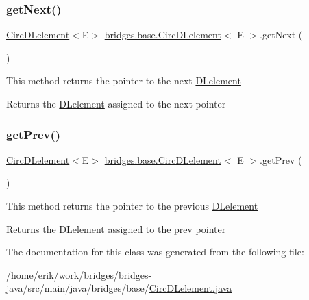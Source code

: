 \subsubsection{\texorpdfstring{get\+Next()}{getNext()}}
{\footnotesize\ttfamily \hyperlink{classbridges_1_1base_1_1_circ_d_lelement}{Circ\+D\+Lelement}$<$E$>$ \hyperlink{classbridges_1_1base_1_1_circ_d_lelement}{bridges.\+base.\+Circ\+D\+Lelement}$<$ E $>$.get\+Next (\begin{DoxyParamCaption}{ }\end{DoxyParamCaption})}

This method returns the pointer to the next \hyperlink{classbridges_1_1base_1_1_d_lelement}{D\+Lelement}

\begin{DoxyReturn}{Returns}
the \hyperlink{classbridges_1_1base_1_1_d_lelement}{D\+Lelement} assigned to the next pointer 
\end{DoxyReturn}
\mbox{\label{classbridges_1_1base_1_1_circ_d_lelement_aa2b83017a571694460f77dd31b4188ed}} 
\subsubsection{\texorpdfstring{get\+Prev()}{getPrev()}}
{\footnotesize\ttfamily \hyperlink{classbridges_1_1base_1_1_circ_d_lelement}{Circ\+D\+Lelement}$<$E$>$ \hyperlink{classbridges_1_1base_1_1_circ_d_lelement}{bridges.\+base.\+Circ\+D\+Lelement}$<$ E $>$.get\+Prev (\begin{DoxyParamCaption}{ }\end{DoxyParamCaption})}

This method returns the pointer to the previous \hyperlink{classbridges_1_1base_1_1_d_lelement}{D\+Lelement}

\begin{DoxyReturn}{Returns}
the \hyperlink{classbridges_1_1base_1_1_d_lelement}{D\+Lelement} assigned to the prev pointer 
\end{DoxyReturn}


The documentation for this class was generated from the following file\+:\begin{DoxyCompactItemize}
\item 
/home/erik/work/bridges/bridges-\/java/src/main/java/bridges/base/\hyperlink{_circ_d_lelement_8java}{Circ\+D\+Lelement.\+java}\end{DoxyCompactItemize}
